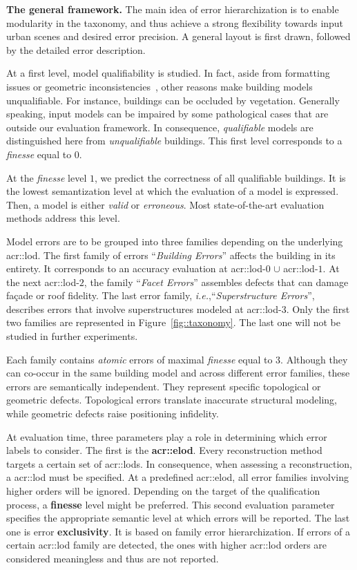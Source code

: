 \documentclass[runningheads]{llncs}
\begin{document}
\noindent
\textbf{The general framework.}
The main idea of error hierarchization is to enable modularity in the taxonomy, and thus achieve a strong flexibility towards input urban scenes and desired error precision. A general layout is first drawn, followed by the detailed error description.

At a first level, model qualifiability is studied. In fact, aside from formatting issues or geometric inconsistencies~\cite{ledoux2018val3dity}, other reasons make building models unqualifiable. For instance, buildings can be occluded by vegetation. Generally speaking, input models can be impaired by some pathological cases that are outside our evaluation framework. In consequence, \textit{qualifiable} models are distinguished here from \textit{unqualifiable} buildings. This first level corresponds to a \textit{finesse} equal to $0$.

At the \textit{finesse} level $1$, we predict the correctness of all qualifiable buildings. It is the lowest semantization level at which the evaluation of a model is expressed. Then, a model is either \textit{valid} or \textit{erroneous}. Most state-of-the-art evaluation methods address this level.

Model errors are to be grouped into three families depending on the underlying \acrshort{acr::lod}. The first family of errors ``\textit{Building Errors}'' affects the building in its entirety. It corresponds to an accuracy evaluation at \acrshort{acr::lod}-$0$ $\cup$ \acrshort{acr::lod}-$1$. At the next \acrshort{acr::lod}-$2$, the family ``\textit{Facet Errors}'' assembles defects that can damage fa\c{c}ade or roof fidelity. The last error family, \textit{i.e.},``\textit{Superstructure Errors}'', describes errors that involve superstructures modeled at \acrshort{acr::lod}-$3$. Only the first two families are represented in Figure~\ref{fig::taxonomy}. The last one will not be studied in further experiments.

Each family contains \textit{atomic} errors of maximal \textit{finesse} equal to $3$. Although they can co-occur in the same building model and across different error families, these errors are semantically independent. They represent specific topological or geometric defects. Topological errors translate inaccurate structural modeling, while geometric defects raise positioning infidelity.

At evaluation time, three parameters play a role in determining which error labels to consider. The first is the \textbf{\acrfull{acr::elod}}. Every reconstruction method targets a certain set of \glspl{acr::lod}. In consequence, when assessing a reconstruction, a \acrshort{acr::lod} must be specified. At a predefined \acrshort{acr::elod}, all error families involving higher orders will be ignored. Depending on the target of the qualification process, a \textbf{finesse} level might be preferred. This second evaluation parameter specifies the appropriate semantic level at which errors will be reported. The last one is error \textbf{exclusivity}. It is based on family error hierarchization. If errors of a certain \acrshort{acr::lod} family are detected, the ones with higher \acrshort{acr::lod} orders are considered meaningless and thus are not reported.
\end{document}
